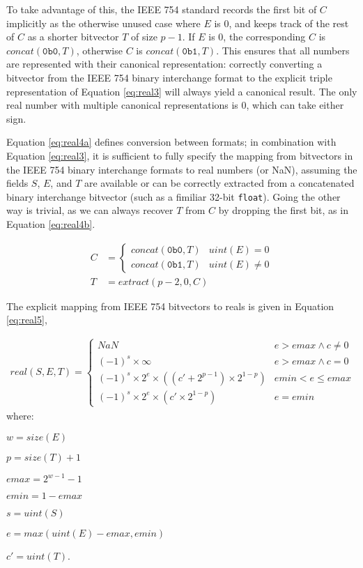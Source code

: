 \documentclass[letterpaper,10pt]{article}
\begin{document}
To take advantage of this, the IEEE 754 standard records the first bit of $C$ implicitly as the otherwise unused case where $E$ is 0, and keeps track of the rest of $C$ as a shorter bitvector $T$ of size $p - 1$. If $E$ is 0, the corresponding $C$ is $concat(\texttt{0b0}, T)$, otherwise $C$ is $concat(\texttt{0b1}, T)$. This ensures that all numbers are represented with their canonical representation: correctly converting a bitvector from the IEEE 754 binary interchange format to the explicit triple representation of Equation \ref{eq:real3} will always yield a canonical result. The only real number with multiple canonical representations is 0, which can take either sign.

Equation \ref{eq:real4a} defines conversion between formats; in combination with Equation \ref{eq:real3}, it is sufficient to fully specify the mapping from bitvectors in the IEEE 754 binary interchange formats to real numbers (or NaN), assuming the fields $S$, $E$, and $T$ are available or can be correctly extracted from a concatenated binary interchange bitvector (such as a fimiliar 32-bit \texttt{float}). Going the other way is trivial, as we can always recover $T$ from $C$ by dropping the first bit, as in Equation \ref{eq:real4b}.

\begin{align} 
 C &= \label{eq:real4a}
 \begin{cases}
  concat(\texttt{0b0}, T) & uint(E) = 0 \\
  concat(\texttt{0b1}, T) & uint(E) \neq 0
 \end{cases} \\
 T &= extract(p-2, 0, C)  \label{eq:real4b}
\end{align}

The explicit mapping from IEEE 754 bitvectors to reals is given in Equation \ref{eq:real5},

\begin{align} \label{eq:real5}
 real(S, E, T) =
 \begin{cases}
  NaN                                                      & e > emax \land c \neq 0 \\
  (-1)^s \times \infty                                     & e > emax \land c = 0    \\
  (-1)^s \times 2^e \times ((c' + 2^{p-1}) \times 2^{1-p}) & emin < e \leq emax      \\
  (-1)^s \times 2^e \times (c' \times 2^{1 - p})           & e = emin
 \end{cases}
\end{align}
where:
\begin{description}
 \item $w = size(E)$
 \item $p = size(T) + 1$
 \item $emax = 2^{w-1} - 1$
 \item $emin = 1 - emax$
 \item $s = uint(S)$
 \item $e = max(uint(E) - emax, emin)$
 \item $c' = uint(T)$.
\end{description}
\end{document}
